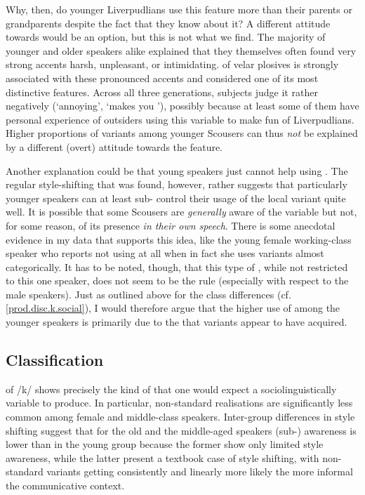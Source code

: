 Why, then, do younger Liverpudlians use this feature more than their parents or grandparents despite the fact that they know about it?
A different attitude towards  would be an option, but this is not what we find.
The majority of younger and older speakers alike explained that they themselves often found very strong  accents harsh, unpleasant, or intimidating.
 of velar plosives is strongly associated with these pronounced  accents and considered one of its most distinctive features.
Across all three generations, subjects judge it rather negatively (`annoying', `makes you '), possibly because at least some of them have personal experience of outsiders using this variable to make fun of Liverpudlians.
Higher proportions of  variants among younger Scousers can thus \emph{not} be explained by a different (overt) attitude towards the feature.

Another explanation could be that young speakers just cannot help using .
The regular style-shifting that was found, however, rather suggests that particularly younger speakers can at least sub- control their usage of the local variant quite well.
It is possible that some Scousers are \emph{generally} aware of the variable but not, for some reason, of its presence \emph{in their own speech}.
There is some anecdotal evidence in my data that supports this idea, like the young female working-class speaker who reports not using  at all when in fact she uses  variants almost categorically.
It has to be noted, though, that this type of , while not restricted to this one speaker, does not seem to be the rule (especially with respect to the male speakers).
Just as outlined above for the class differences (cf. \ref{prod.disc.k.social}), I would therefore argue that the higher use of  among the younger speakers is primarily due to the   that  variants appear to have acquired.

\subsection{Classification}
\label{prod.disc.k.classification}

 of /k/ shows precisely the kind of  that one would expect a sociolinguistically  variable to produce.
In particular, non-standard realisations are significantly less common among female and middle-class speakers.
Inter-group differences in style shifting suggest that for the old and the middle-aged speakers (sub-) awareness is lower than in the young group because the former show only limited style awareness, while the latter present a textbook case of  style shifting, with non-standard variants getting consistently and linearly more likely the more informal the communicative context.

